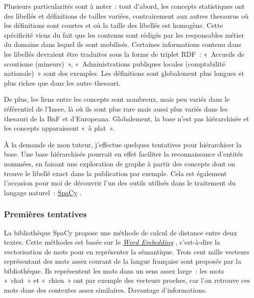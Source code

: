 Plusieurs particularités sont à noter~: tout d'abord, les concepts statistiques ont des libellés et définitions de tailles variées, contrairement aux autres thesaurus où les définitions sont courtes et où la taille des libellés est homogène. Cette spécificité viens du fait que les contenus sont rédigés par les responsables métier du domaine dans lequel ils sont mobilisés. Certaines informations contenu dans les libellés devraient être traduites sous la forme de triplet RDF~: «~Accueils de scoutisme (mineurs)~», «~Administrations publiques locales (comptabilité nationale)~» sont des exemples. Les définitions sont globalement plus longues et plus riches que dans les autre thesauri.

De plus, les liens entre les concepts sont nombreux, mais peu variés dans le référentiel de l'Insee, là où ils sont plus rare mais aussi plus variés dans les thesauri de la BnF et d'Europeana. Globalement, la base n'est pas hiérarchisée et les concepts apparaissent «~à plat~».
\newline

À la demande de mon tuteur, j'effectue quelques tentatives pour hiérarchiser la base. Une base hiérarchisée pourrait en effet faciliter la reconnaissance d'entités nommées, en faisant une exploration de graphe à partir des concepts dont on trouve le libellé exact dans la publication par exemple. Cela est également l'occasion pour moi de découvrir l'un des outils utilisés dans le traitement du langage naturel~: \href{https://spacy.io/}{SpaCy} \cite{spacy2}.
\label{section 1.2.1}

\subsubsection*{Premières tentatives}
La bibliothèque SpaCy propose une méthode de calcul de distance entre deux textes. Cette méthodes est basée sur le \href{https://en.wikipedia.org/wiki/Word_embedding}{\textit{Word Embedding}} \cite{word-embedding} \cite{word-embedding-opencls}, c'est-à-dire la vectorisation de mots pour en représenter la sémantique. Trois cent mille vecteurs représentant des mots assez courant de la langue française sont proposés par la bibliothèque. Ils représentent les mots dans un sens assez large~: les mots «~chat~» et «~chien~» ont par exemple des vecteurs proches, car l'on retrouve ces mots dans des contextes assez similaires. Davantage d'informations.
\newline

